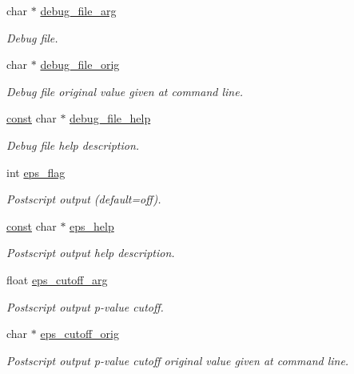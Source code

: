 \begin{DoxyCompactItemize}
char $\ast$ \hyperlink{structgengetopt__args__info_a648135bce096c7f592d4a6cc6d2b4d20}{debug\+\_\+file\+\_\+arg}
\begin{DoxyCompactList}\small\item\em Debug file. \end{DoxyCompactList}\item 
char $\ast$ \hyperlink{structgengetopt__args__info_a2b22e7ebbc50b2b054e9be56785fb2de}{debug\+\_\+file\+\_\+orig}
\begin{DoxyCompactList}\small\item\em Debug file original value given at command line. \end{DoxyCompactList}\item 
\hyperlink{getopt_8c_a2c212835823e3c54a8ab6d95c652660e}{const} char $\ast$ \hyperlink{structgengetopt__args__info_af5d881c802b02a6f85b5e4b957de85e9}{debug\+\_\+file\+\_\+help}
\begin{DoxyCompactList}\small\item\em Debug file help description. \end{DoxyCompactList}\item 
int \hyperlink{structgengetopt__args__info_a4c97eb3971c8f9222073e63484872bf0}{eps\+\_\+flag}
\begin{DoxyCompactList}\small\item\em Postscript output (default=off). \end{DoxyCompactList}\item 
\hyperlink{getopt_8c_a2c212835823e3c54a8ab6d95c652660e}{const} char $\ast$ \hyperlink{structgengetopt__args__info_aa87d33b8ebe4fa33c6c4b7454c3e7e55}{eps\+\_\+help}
\begin{DoxyCompactList}\small\item\em Postscript output help description. \end{DoxyCompactList}\item 
float \hyperlink{structgengetopt__args__info_a7d5c15c092764baac13552613fda575f}{eps\+\_\+cutoff\+\_\+arg}
\begin{DoxyCompactList}\small\item\em Postscript output p-\/value cutoff. \end{DoxyCompactList}\item 
char $\ast$ \hyperlink{structgengetopt__args__info_ad2f45ed857ac6e6d8b1a371d85b65e25}{eps\+\_\+cutoff\+\_\+orig}
\begin{DoxyCompactList}\small\item\em Postscript output p-\/value cutoff original value given at command line. \end{DoxyCompactList}\item 

\end{DoxyCompactItemize}
